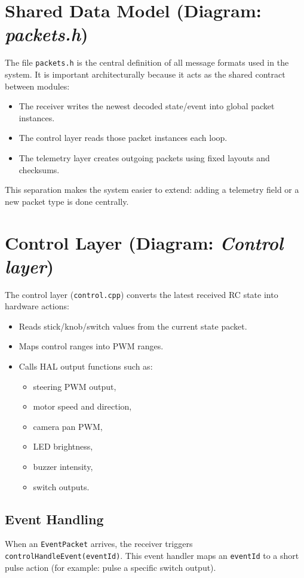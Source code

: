 \section{Shared Data Model (Diagram: \textit{packets.h})}

The file \texttt{packets.h} is the central definition of all message formats used in the system.
It is important architecturally because it acts as the shared contract between modules:

\begin{itemize}
    \item The receiver writes the newest decoded state/event into global packet instances.
    \item The control layer reads those packet instances each loop.
    \item The telemetry layer creates outgoing packets using fixed layouts and checksums.
\end{itemize}

This separation makes the system easier to extend: adding a telemetry field or a new packet type is done centrally.

\section{Control Layer (Diagram: \textit{Control layer})}

The control layer (\texttt{control.cpp}) converts the latest received RC state into hardware actions:

\begin{itemize}
    \item Reads stick/knob/switch values from the current state packet.
    \item Maps control ranges into PWM ranges.
    \item Calls HAL output functions such as:
    \begin{itemize}
        \item steering PWM output,
        \item motor speed and direction,
        \item camera pan PWM,
        \item LED brightness,
        \item buzzer intensity,
        \item switch outputs.
    \end{itemize}
\end{itemize}

\subsection{Event Handling}
When an \texttt{EventPacket} arrives, the receiver triggers \texttt{controlHandleEvent(eventId)}.
This event handler maps an \texttt{eventId} to a short pulse action (for example: pulse a specific switch output).

